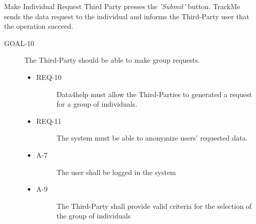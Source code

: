 \documentclass[a4paper]{article}
\newcommand{\requirement}{\ding{229}}%
\begin{document}
        \begin{usecase}{ Make Individual Request}
        {Third Party presses the \textit{'Submit'} button.}
        {TrackMe sends the data request to the individual and informs the Third-Party user that the operation succeed.}
        \end{usecase}
        
        \begin{description}
        	\item[GOAL-10] The Third-Party should be able to make group requests. 
            	\begin{itemize}
            	    \item[\requirement]
                	\begin{description}
                	\item[REQ-10] Data4help must allow the Third-Parties to generated a request for a group of individuals. 
                	\end{description}
                	\item[\requirement]
                	\begin{description}
                	\item[REQ-11] The system must be able to anonymize users' requested data. 
                	\end{description}
                	\item
                	\begin{description}
                	\item[A-7] The user shall be logged in the system
                	\end{description}
                	\item
                	\begin{description}
                	\item[A-9] The Third-Party shall provide valid criteria for the selection of the group of individuals
                	\end{description}
                	\end{itemize}
        \end{description}
        
\end{document}
